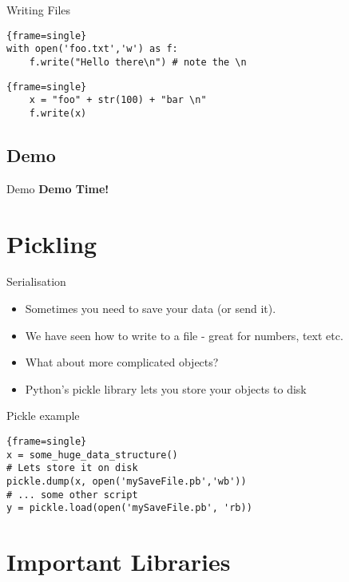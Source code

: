\documentclass{beamer}
\begin{document}
\begin{frame}[fragile]{Writing Files}
  \begin{block}{}
\begin{lstlisting}{frame=single}
with open('foo.txt','w') as f:
    f.write("Hello there\n") # note the \n
\end{lstlisting}
\end{block}
\pause
\begin{block}{}
\begin{lstlisting}{frame=single}
    x = "foo" + str(100) + "bar \n"
    f.write(x)
\end{lstlisting}
\end{block}
\end{frame}


\subsection{Demo}
\begin{frame}[fragile]{Demo}
	 \huge{\textbf{Demo Time!}}
\end{frame}
\section{Pickling}
\begin{frame}[fragile]{Serialisation}
\begin{itemize}
\item Sometimes you need to save your data (or send it).
\pause
\item We have seen how to write to a file - great for numbers, text etc.
\item What about more complicated objects?
\pause
\item Python's pickle library lets you store your objects to disk
\end{itemize}
\end{frame}
\begin{frame}[fragile]{Pickle example}
\begin{block}{}
\begin{lstlisting}{frame=single}
x = some_huge_data_structure()
# Lets store it on disk
pickle.dump(x, open('mySaveFile.pb','wb')) 
# ... some other script
y = pickle.load(open('mySaveFile.pb', 'rb))
\end{lstlisting}
\end{block}
\end{frame}

\section{Important Libraries}
\end{document}
